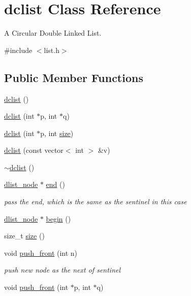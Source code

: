 \hypertarget{classdclist}{\section{dclist Class Reference}
\label{classdclist}
}


A Circular Double Linked List.  




{\ttfamily \#include $<$list.\-h$>$}

\subsection*{Public Member Functions}
\begin{DoxyCompactItemize}
\item 
\hyperlink{classdclist_adf50f8c57c3fd39aabf60fad51033c0e}{dclist} ()
\item 
\hyperlink{classdclist_a7eec5a55914fb005e39bf0f09ea938ba}{dclist} (int $\ast$p, int $\ast$q)
\item 
\hyperlink{classdclist_a7f87e0b8b308dd3fe0c3b8017aad2973}{dclist} (int $\ast$p, int \hyperlink{classdclist_a4aad3140e1ecd8f9ae393cfe42b440a5}{size})
\item 
\hyperlink{classdclist_a7f3da5d5f4ede734c5cbe7b2ecd31980}{dclist} (const vector$<$ int $>$ \&v)
\item 
\hyperlink{classdclist_a42c10662b1c0b0c5d91236a10aacc638}{$\sim$dclist} ()
\item 
\hyperlink{structdlist__node}{dlist\-\_\-node} $\ast$ \hyperlink{classdclist_a02c4135f1d4bfd026e2634ce97e11bc2}{end} ()
\begin{DoxyCompactList}\small\item\em pass the end, which is the same as the sentinel in this case \end{DoxyCompactList}\item 
\hyperlink{structdlist__node}{dlist\-\_\-node} $\ast$ \hyperlink{classdclist_a04e5f7c6204e24ab0bbcb6d9cf732301}{begin} ()
\item 
size\-\_\-t \hyperlink{classdclist_a4aad3140e1ecd8f9ae393cfe42b440a5}{size} ()
\item 
void \hyperlink{classdclist_a8137b2afc567b71225b97ebe32de6ea8}{push\-\_\-front} (int n)
\begin{DoxyCompactList}\small\item\em push new node as the next of sentinel \end{DoxyCompactList}\item 
void \hyperlink{classdclist_ac7c566527b54091161415781db391d27}{push\-\_\-front} (int $\ast$p, int $\ast$q)

\end{DoxyCompactItemize}

